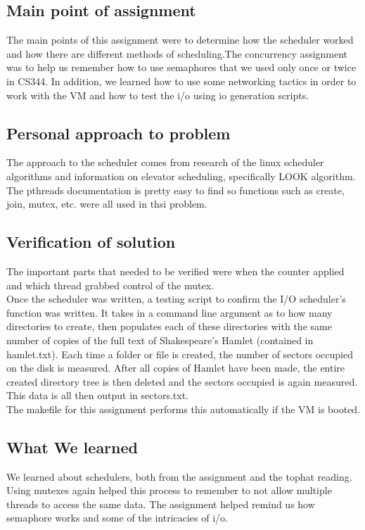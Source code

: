 \documentclass[letterpaper,10pt,titlepage]{article}
\begin{document}
\subsection{Main point of assignment}
The main points of this assignment were to determine how the scheduler worked and how there are different methods of scheduling.The concurrency assignment was to help us remember how to use semaphores that we used only once or twice in CS344.  In addition, we learned how to use some networking tactics in order to work with the VM and how to test the i/o using io generation scripts.

\subsection{Personal approach to problem}
The approach to the scheduler comes from research of the linux scheduler algorithms and information on elevator scheduling, specifically LOOK algorithm.  The pthreads documentation is pretty easy to find so functions such as create, join, mutex, etc. were all used in thsi problem.  

\subsection{Verification of solution}
The important parts that needed to be verified were when the counter applied and which thread grabbed control of the mutex. \\

Once the scheduler was written, a testing script to confirm the I/O scheduler's function was written. It takes in a command line argument as to how many directories to create, then populates each of these directories with the same number of copies of the full text of Shakespeare's Hamlet (contained in hamlet.txt). Each time a folder or file is created, the number of sectors occupied on the disk is measured. After all copies of Hamlet have been made, the entire created directory tree is then deleted and the sectors occupied is again measured. This data is all then output in sectors.txt. \\

The makefile for this assignment performs this automatically if the VM is booted.


\subsection{What We learned}
We learned about schedulers, both from the assignment and the tophat reading. Using mutexes again helped this process to remember to not allow multiple threads to access the same data.  The assignment helped remind us how semaphore works and some of the intricacies of i/o.
\end{document}

